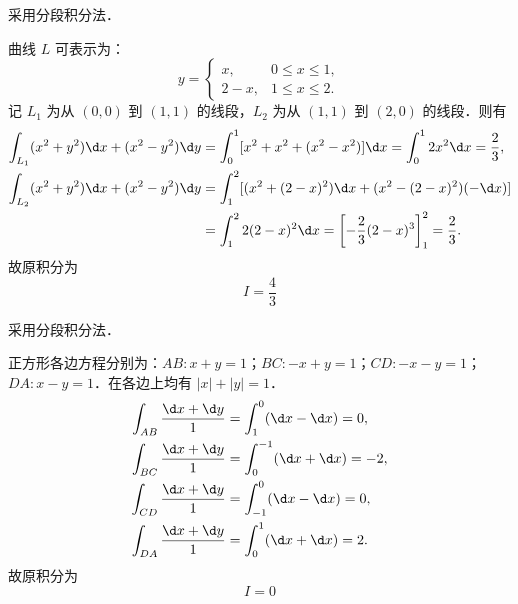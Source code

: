 \begin{solution}
    采用分段积分法．

    曲线 $L$ 可表示为：
    \begin{equation}
        y = \begin{cases} x, & 0 \le x \le 1, \\ 2 - x, & 1 \le x \le 2. \end{cases}
    \end{equation}
    记 $L_1$ 为从 $(0,0)$ 到 $(1,1)$ 的线段，$L_2$ 为从 $(1,1)$ 到 $(2,0)$ 的线段．则有
    \begin{equation}
        \begin{aligned}
            \int_{L_1} (x^2 + y^2) \d x + (x^2 - y^2) \d y & = \int_0^1 [x^2 + x^2 + (x^2 - x^2)] \d x = \int_0^1 2x^2 \d x = \frac{2}{3},    \\
            \int_{L_2} (x^2 + y^2) \d x + (x^2 - y^2) \d y & = \int_1^2 [(x^2 + (2-x)^2) \d x + (x^2 - (2-x)^2) (-\d x)]                      \\
                                                           & = \int_1^2 2(2-x)^2 \d x = \left[ -\frac{2}{3}(2-x)^3 \right]_1^2 = \frac{2}{3}.
        \end{aligned}
    \end{equation}
    故原积分为
    \begin{equation}
        I = \boxed{\frac{4}{3}}
    \end{equation}

    采用分段积分法．

    正方形各边方程分别为：$AB: x+y=1$；$BC: -x+y=1$；$CD: -x-y=1$；$DA: x-y=1$．在各边上均有 $|x|+|y|=1$．
    \begin{equation}
        \begin{aligned}
            \int_{AB} \frac{\d x + \d y}{1} & = \int_1^0 (\d x - \d x) = 0,     \\
            \int_{BC} \frac{\d x + \d y}{1} & = \int_0^{-1} (\d x + \d x) = -2, \\
            \int_{CD} \frac{\d x + \d y}{1} & = \int_{-1}^0 (\d x - \d x) = 0,  \\
            \int_{DA} \frac{\d x + \d y}{1} & = \int_0^1 (\d x + \d x) = 2.
        \end{aligned}
    \end{equation}
    故原积分为
    \begin{equation}
        I = \boxed{0}
    \end{equation}


\end{solution}
